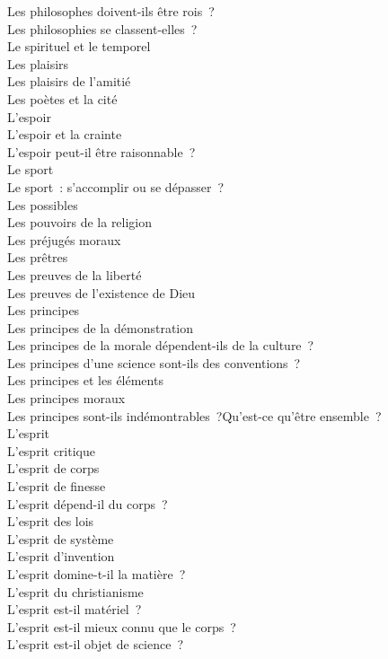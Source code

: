 \documentclass[a4paper,12pt]{article}
\begin{document}
Les philosophes doivent-ils être rois ? \\
Les philosophies se classent-elles ? \\
Le spirituel et le temporel \\
Les plaisirs \\
Les plaisirs de l'amitié \\
Les poètes et la cité \\
L'espoir \\
L'espoir et la crainte \\
L'espoir peut-il être raisonnable ? \\
Le sport \\
Le sport : s'accomplir ou se dépasser ? \\
Les possibles \\
Les pouvoirs de la religion \\
Les préjugés moraux \\
Les prêtres \\
Les preuves de la liberté \\
Les preuves de l'existence de Dieu \\
Les principes \\
Les principes de la démonstration \\
Les principes de la morale dépendent-ils de la culture ? \\
Les principes d'une science sont-ils des conventions ? \\
Les principes et les éléments \\
Les principes moraux \\
Les principes sont-ils indémontrables ?Qu'est-ce qu'être ensemble ? \\
L'esprit \\
L'esprit critique \\
L'esprit de corps \\
L'esprit de finesse \\
L'esprit dépend-il du corps ? \\
L'esprit des lois \\
L'esprit de système \\
L'esprit d'invention \\
L'esprit domine-t-il la matière ? \\
L'esprit du christianisme \\
L'esprit est-il matériel ? \\
L'esprit est-il mieux connu que le corps ? \\
L'esprit est-il objet de science ? \\
\end{document}
